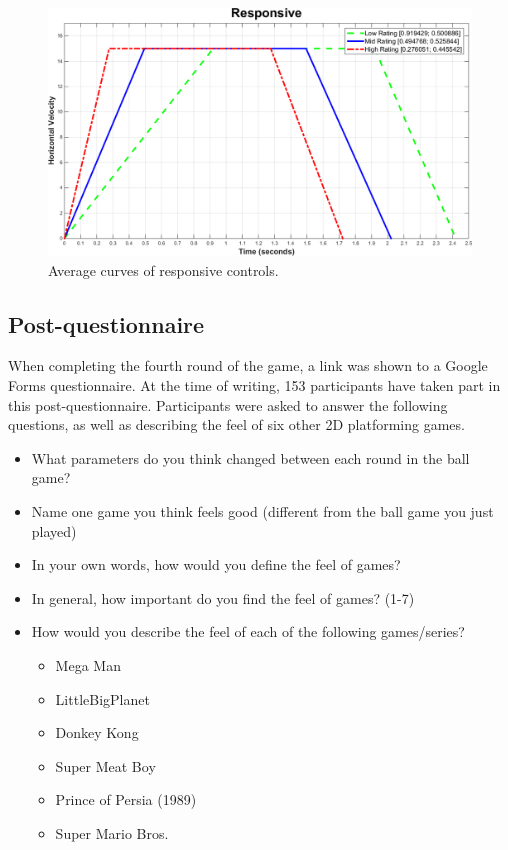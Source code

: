 \begin{figure}[htbp]
\centering
\includegraphics[width=0.9\columnwidth]{Pics/Curves/Responsive_curve}
\caption{Average curves of responsive controls.}
\label{fig:curve_responsive}
\end{figure}

\subsection{Post-questionnaire}
When completing the fourth round of the game, a link was shown to a Google Forms questionnaire. At the time of writing, 153 participants have taken part in this post-questionnaire. Participants were asked to answer the following questions, as well as describing the feel of six other 2D platforming games.
\begin{itemize}[noitemsep,nolistsep]
\item What parameters do you think changed between each round in the ball game?
\item Name one game you think feels good (different from the ball game you just played)
\item In your own words, how would you define the feel of games?
\item In general, how important do you find the feel of games? (1-7)
\item How would you describe the feel of each of the following games/series?
\begin{itemize}[noitemsep,nolistsep]
\item Mega Man
\item LittleBigPlanet
\item Donkey Kong
\item Super Meat Boy
\item Prince of Persia (1989)
\item Super Mario Bros.
\end{itemize}
\end{itemize}

